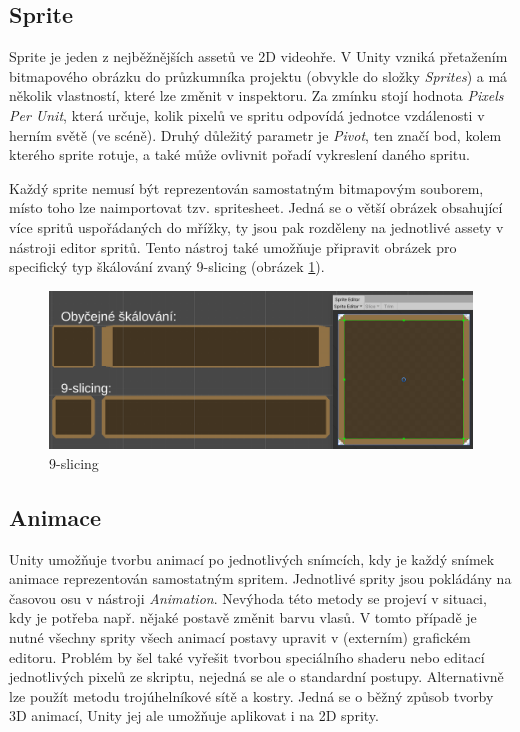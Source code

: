 \documentclass[FM,Proj]{tulthesis}
\begin{document}
	\subsection{Sprite} %
	
	Sprite je jeden z nejběžnějších assetů ve 2D videohře. V Unity vzniká přetažením bitmapového obrázku do průzkumníka projektu (obvykle do složky \textit{Sprites}) a má několik vlastností, které lze změnit v inspektoru. Za zmínku stojí hodnota \textit{Pixels Per Unit}, která určuje, kolik pixelů ve spritu odpovídá jednotce vzdálenosti v herním světě (ve scéně). Druhý důležitý parametr je \textit{Pivot}, ten značí bod, kolem kterého sprite rotuje, a také může ovlivnit pořadí vykreslení daného spritu.
	
	Každý sprite nemusí být reprezentován samostatným bitmapovým souborem, místo toho lze naimportovat tzv. spritesheet. Jedná se o větší obrázek obsahující více spritů uspořádaných do mřížky, ty jsou pak rozděleny na jednotlivé assety v nástroji editor spritů. Tento nástroj také umožňuje připravit obrázek pro specifický typ škálování zvaný 9-slicing (obrázek \ref{img9Slicing}).
	
	\begin{figure}[ht]
		\centering
		\includegraphics[width=\textwidth]{img/9Slicing}
		\caption{9-slicing}
		\label{img9Slicing}
	\end{figure}
	
	\subsection{Animace}
	
	Unity umožňuje tvorbu animací po jednotlivých snímcích, kdy je každý snímek animace reprezentován samostatným spritem. Jednotlivé sprity jsou pokládány na časovou osu v nástroji \textit{Animation}. Nevýhoda této metody se projeví v situaci, kdy je potřeba např. nějaké postavě změnit barvu vlasů. V tomto případě je nutné všechny sprity všech animací postavy upravit v (externím) grafickém editoru. Problém by šel také vyřešit tvorbou speciálního shaderu nebo editací jednotlivých pixelů ze skriptu, nejedná se ale o standardní postupy. Alternativně lze použít metodu trojúhelníkové sítě a kostry. Jedná se o běžný způsob tvorby 3D animací, Unity jej ale umožňuje aplikovat i na 2D sprity.
	
\end{document}
